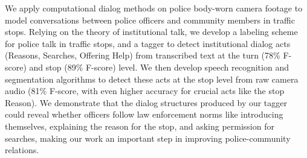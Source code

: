 We apply computational dialog methods on police body-worn camera footage to model conversations between police officers and community members in traffic stops. Relying on the theory of institutional talk, we develop a labeling scheme for police talk in traffic stops, and a tagger to detect institutional dialog acts (Reasons, Searches, Offering Help) from transcribed text at the turn (78\% F-score) and stop (89\% F-score) level. We then develop speech recognition and segmentation algorithms to detect these acts at the stop level from raw camera audio (81\% F-score, with even higher accuracy for crucial acts like the stop Reason). We demonstrate that the dialog structures produced by our tagger could reveal whether officers follow law enforcement norms like introducing themselves, explaining the reason for the stop, and asking permission for searches, making our work an important step in improving police-community relations.